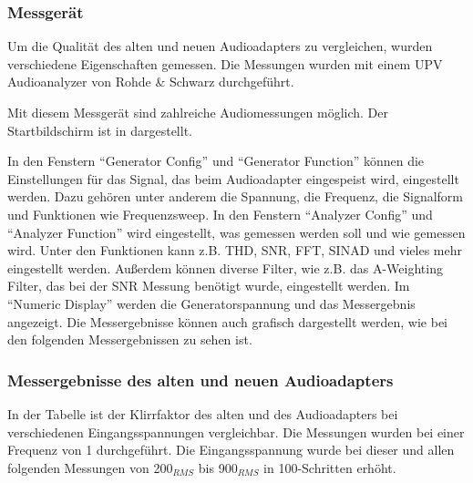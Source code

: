 \subsubsection{Messgerät}
\label{sec:audio-messgerät}
Um die Qualität des alten und neuen Audioadapters zu vergleichen, wurden verschiedene Eigenschaften gemessen. Die Messungen wurden mit einem UPV Audioanalyzer von Rohde \& Schwarz durchgeführt.


Mit diesem Messgerät sind zahlreiche Audiomessungen möglich. Der Startbildschirm ist in  dargestellt.


In den Fenstern \enquote{Generator Config} und \enquote{Generator Function} können die Einstellungen für das Signal, das beim Audioadapter eingespeist wird, eingestellt werden. Dazu gehören unter anderem die Spannung, die Frequenz, die Signalform und Funktionen wie Frequenzsweep. In den Fenstern \enquote{Analyzer Config} und \enquote{Analyzer Function} wird eingestellt, was gemessen werden soll und wie gemessen wird. Unter den Funktionen kann z.B. THD, SNR, FFT, SINAD und vieles mehr eingestellt werden. Außerdem können diverse Filter, wie z.B. das A-Weighting Filter, das bei der SNR Messung benötigt wurde, eingestellt werden. Im \enquote{Numeric Display} werden die Generatorspannung und das Messergebnis angezeigt. Die Messergebnisse können auch grafisch dargestellt werden, wie bei den folgenden Messergebnissen zu sehen ist.

\subsubsection{Messergebnisse des alten und neuen Audioadapters}
\label{sec:audio-messergebnisse}
In der Tabelle ist der Klirrfaktor des alten und des Audioadapters bei verschiedenen Eingangsspannungen vergleichbar. Die Messungen wurden bei einer Frequenz von \unit{1}{\kilo\hertz} durchgeführt. Die Eingangsspannung wurde bei dieser und allen folgenden Messungen von \unit{200}{\milli\volt}$_{RMS}$ bis \unit{900}{\milli\volt}$_{RMS}$ in \unit{100}{\milli\volt}-Schritten erhöht.

